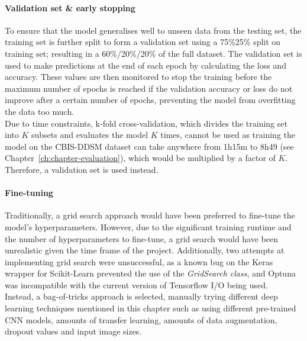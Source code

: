 \paragraph{Validation set \& early stopping}
\label{sec:design-validation-early-stopping}

To ensure that the model generalises well to unseen  data from the testing set, the training set is further split to form a validation set using a 75\%25\% split on training set; resulting in a 60\%/20\%/20\% of the full dataset. The validation set is used to make predictions at the end of each epoch by calculating the loss and accuracy. These values are then monitored to stop the training before the maximum number of epochs is reached if the validation accuracy or loss do not improve after a certain number of epochs, preventing the model from overfitting the data too much.\\

Due to time constraints, k-fold cross-validation, which divides the training set into $K$ subsets and evaluates the model $K$ times, cannot be used as training the model on the CBIS-DDSM dataset can take anywhere from 1h15m to 8h49 (see Chapter~\ref{ch:chapter-evaluation}), which would be multiplied by a factor of $K$. Therefore, a validation set is used instead.

\paragraph{Fine-tuning}
\label{sec:design-fine-tuning-bagoftricks}

Traditionally, a grid search approach would have been preferred to fine-tune the model's hyperparameters. However, due to the significant training runtime and the number of hyperparameters to fine-tune, a grid search would have been unrealistic given the time frame of the project. Additionally, two attempts at implementing grid search were unsuccessful, as a known bug on the Keras wrapper for Scikit-Learn prevented the use of the \textit{GridSearch class}, and Optuna was incompatible with the current version of Tensorflow I/O being used.\\

Instead, a bag-of-tricks approach is selected, manually trying different deep learning techniques mentioned in this chapter such as using different pre-trained CNN models, amounts of transfer learning, amounts of data augmentation, dropout values and input image sizes.

